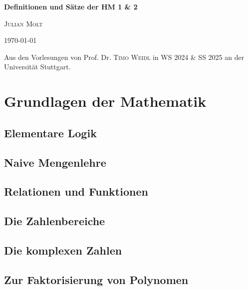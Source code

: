 \documentclass[11pt,a4paper]{report}
\begin{document}
\begin{titlepage}
	\centering
	\vspace*{2.5cm}

	{\sffamily \textbf{\Huge Definitionen und Sätze der HM 1 \& 2}\par}
	\vspace{2cm}
	{\huge \textsc{Julian Molt}\par}
	\vspace{1cm}
	{\Large \today\par}

	\vspace{\fill}

	{}

	\vspace{\fill}

	{Aus den Vorlesungen von Prof. Dr. \textsc{Timo Weidl} in WS 2024 \& SS 2025 an der Universität Stuttgart.}
\end{titlepage}


\newpage%
\tableofcontents
\pagebreak

\chapter{Grundlagen der Mathematik}
\section{Elementare Logik}
\section{Naive Mengenlehre}
\section{Relationen und Funktionen}
\section{Die Zahlenbereiche}
\section{Die komplexen Zahlen}
\section{Zur Faktorisierung von Polynomen}
\end{document}
